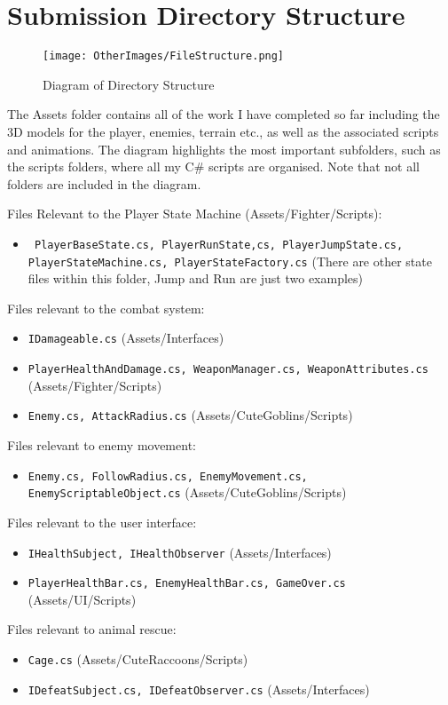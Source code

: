 \documentclass[]{final_report}
\begin{document}
\newpage

\section{Submission Directory Structure}
\begin{figure}[h!]
    \centering
    \texttt{[image: OtherImages/FileStructure.png]}
    \caption{Diagram of Directory Structure}
    \label{fig:label_name2}
\end{figure}
The Assets folder contains all of the work I have completed so far including the 3D models for the player, enemies, terrain etc., as well as the associated scripts and animations. The diagram highlights the most important subfolders, such as the scripts folders, where all my C\# scripts are organised. Note that not all folders are included in the diagram. \newline

Files Relevant to the Player State Machine (Assets/Fighter/Scripts):
\begin{itemize}
    \item \texttt{ PlayerBaseState.cs, PlayerRunState,cs, PlayerJumpState.cs, PlayerStateMachine.cs, PlayerStateFactory.cs} (There are other state files within this folder, Jump and Run are just two examples)
\end{itemize}

Files relevant to the combat system:
\begin{itemize}
    \item \texttt{IDamageable.cs} (Assets/Interfaces)
    \item \texttt{PlayerHealthAndDamage.cs, WeaponManager.cs, WeaponAttributes.cs} (Assets/Fighter/Scripts)
    \item \texttt{Enemy.cs, AttackRadius.cs} (Assets/CuteGoblins/Scripts)
\end{itemize}
Files relevant to enemy movement:
\begin{itemize}
    \item \texttt{Enemy.cs, FollowRadius.cs, EnemyMovement.cs, EnemyScriptableObject.cs} (Assets/CuteGoblins/Scripts)
\end{itemize}
Files relevant to the user interface:
\begin{itemize}
    \item \texttt{IHealthSubject, IHealthObserver} (Assets/Interfaces)
    \item \texttt{PlayerHealthBar.cs, EnemyHealthBar.cs, GameOver.cs} (Assets/UI/Scripts)
\end{itemize}
Files relevant to animal rescue:
\begin{itemize}
    \item \texttt{Cage.cs} (Assets/CuteRaccoons/Scripts)
    \item \texttt{IDefeatSubject.cs, IDefeatObserver.cs} (Assets/Interfaces)
\end{itemize}
\end{document}
